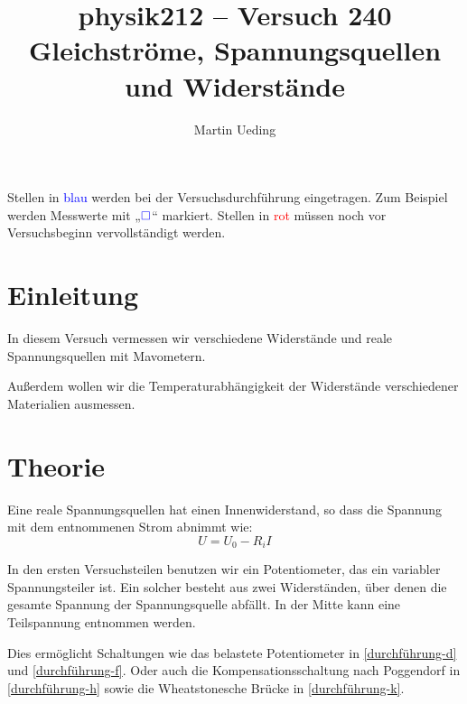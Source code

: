 \documentclass[11pt,german]{article}
\title{physik212 -- Versuch 240 \\ Gleichströme, Spannungsquellen und Widerstände}
\author{Martin Ueding}
\newcommand{\messwert}{\textcolor{blue}{\square}}
\begin{document}
\maketitle

\tableofcontents

\vfill

Stellen in \textcolor{blue}{blau} werden bei der Versuchsdurchführung eingetragen. Zum Beispiel werden Messwerte mit „$\messwert$“ markiert. Stellen in \textcolor{red}{rot} müssen noch vor Versuchsbeginn vervollständigt werden.

\newpage


\section{Einleitung}

In diesem Versuch vermessen wir verschiedene Widerstände und reale
Spannungsquellen mit Mavometern.

Außerdem wollen wir die Temperaturabhängigkeit der Widerstände verschiedener
Materialien ausmessen.


\section{Theorie}

Eine reale Spannungsquellen hat einen Innenwiderstand, so dass die Spannung mit dem entnommenen Strom abnimmt wie:
\[ U = U_0 - R_i I \]

In den ersten Versuchsteilen benutzen wir ein Potentiometer, das ein variabler Spannungsteiler ist. Ein solcher besteht aus zwei Widerständen, über denen die gesamte Spannung der Spannungsquelle abfällt. In der Mitte kann eine Teilspannung entnommen werden.

Dies ermöglicht Schaltungen wie das belastete Potentiometer in \ref{durchführung-d} und \ref{durchführung-f}. Oder auch die Kompensationsschaltung nach Poggendorf in \ref{durchführung-h} sowie die Wheatstonesche Brücke in \ref{durchführung-k}.
\end{document}
